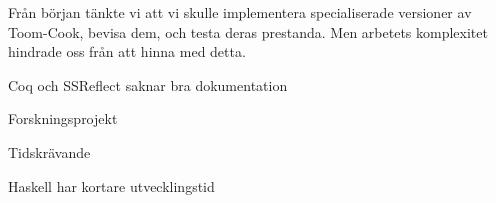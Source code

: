 Från början tänkte vi att vi skulle implementera specialiserade versioner av
Toom-Cook, bevisa dem, och testa deras prestanda. Men arbetets komplexitet
hindrade oss från att hinna med detta.

Coq och SSReflect saknar bra dokumentation

Forskningsprojekt

Tidskrävande

Haskell har kortare utvecklingstid
